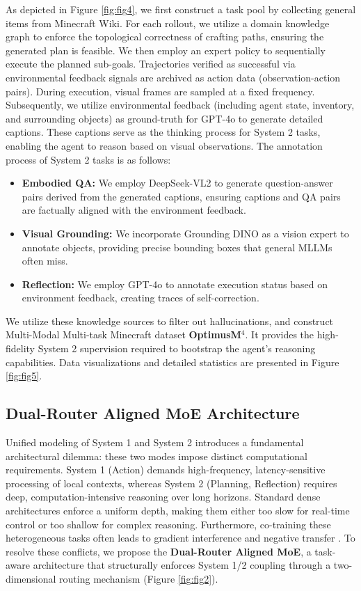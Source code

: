 As depicted in Figure \ref{fig:fig4}, we first construct a task pool by collecting general items from Minecraft Wiki. For each rollout, we utilize a domain knowledge graph \cite{li2024optimus} to enforce the topological correctness of crafting paths, ensuring the generated plan is feasible. We then employ an expert policy \cite{lifshitz2024steve} to sequentially execute the planned sub-goals. Trajectories verified as successful via environmental feedback signals are archived as action data (observation-action pairs). During execution, visual frames are sampled at a fixed frequency. Subsequently, we utilize environmental feedback (including agent state, inventory, and surrounding objects) as ground-truth for GPT-4o \cite{gpt4} to generate detailed captions. These captions serve as the thinking process for System 2 tasks, enabling the agent to reason based on  visual observations. The annotation process of System 2 tasks is as follows:
\begin{itemize}
    \item \textbf{Embodied QA:} We employ DeepSeek-VL2 \cite{lu2024deepseek} to generate question-answer pairs derived from the generated captions, ensuring captions and QA pairs are factually aligned with the environment feedback.
    \item \textbf{Visual Grounding:} We incorporate Grounding DINO \cite{liu2023grounding} as a vision expert to annotate objects, providing precise bounding boxes that general MLLMs often miss.
    \item \textbf{Reflection:} We employ GPT-4o \cite{gpt4} to annotate execution status based on environment feedback, creating traces of self-correction.
\end{itemize}
We utilize these knowledge sources to filter out hallucinations, and construct Multi-Modal Multi-task Minecraft dataset \textbf{OptimusM$^4$}. It provides the high-fidelity System 2 supervision required to bootstrap the agent's reasoning capabilities. Data visualizations and detailed statistics are presented in Figure \ref{fig:fig5}.



\subsection{Dual-Router Aligned MoE Architecture}
\label{moe}
Unified modeling of System 1 and System 2 introduces a fundamental architectural dilemma: these two modes impose distinct computational requirements. System 1 (Action) demands high-frequency, latency-sensitive processing of local contexts, whereas System 2 (Planning, Reflection) requires deep, computation-intensive reasoning over long horizons. Standard dense architectures enforce a uniform depth, making them either too slow for real-time control or too shallow for complex reasoning. Furthermore, co-training these heterogeneous tasks often leads to gradient interference and negative transfer \cite{moesurvey,huang2025modes}. To resolve these conflicts, we propose the \textbf{Dual-Router Aligned MoE}, a task-aware architecture that structurally enforces System 1/2 coupling through a two-dimensional routing mechanism (Figure \ref{fig:fig2}). 



